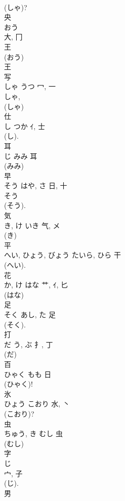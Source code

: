 \documentclass[8pt]{extreport}
\begin{document}
\begin{CJK}{UTF8}{min}
\\	(しゃ)? 
\\	央	
\\	おう	
\\	大, 冂	
\\	王
\\	(おう) 
\\	王 
\\	写	
\\	しゃ	うつ	冖, 一		
\\	しゃ, 
\\	(しゃ) 
\\	仕	
\\	し	つか	ｲ, 士	
\\	(し). 
\\	耳	
\\	じ	みみ	耳	
\\	(みみ) 
\\	早	
\\	そう	はや, さ	日, 十	
\\	そう 
\\	(そう). 
\\	気	
\\	き, け	いき	气, メ	
\\	(き) 
\\	平	
\\	へい, ひょう, びょう	たいら, ひら	干		
\\	(へい). 
\\	花	
\\	か, け	はな	艹, ｲ, 匕	
\\	(はな) 
\\	足	
\\	そく	あし, た	足	
\\	(そく).	
\\	打	
\\	だ	う, ぶ	扌, 丁	
\\	(だ) 
\\	百	
\\	ひゃく	もも	日		
\\	(ひゃく)!
\\	氷	
\\	ひょう	こおり	水, 丶	
\\	(こおり)? 
\\	虫	
\\	ちゅう, き	むし	虫	
\\	(むし) 
\\	字	
\\	じ	
\\	宀, 子	
\\	(じ). 
\\	男	

\end{CJK}
\end{document}
